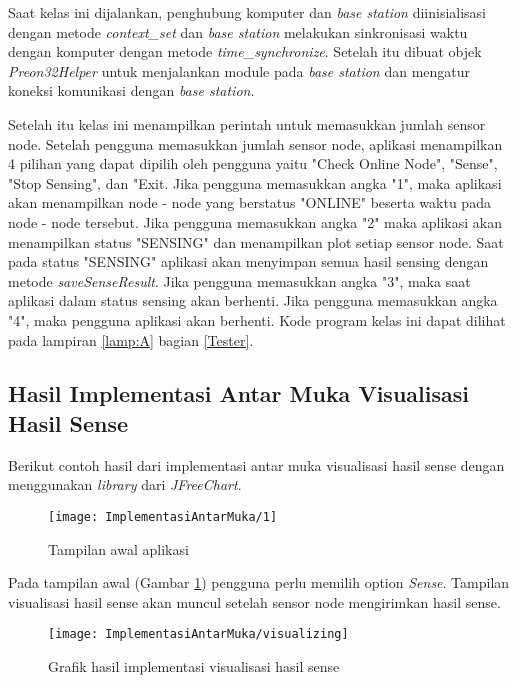 Saat kelas ini dijalankan, penghubung komputer dan {\it base station} diinisialisasi dengan metode {\it context\_set} dan {\it base station} melakukan sinkronisasi waktu dengan komputer dengan metode {\it time\_synchronize}. Setelah itu dibuat objek {\it Preon32Helper} untuk menjalankan module pada {\it base station} dan mengatur koneksi komunikasi dengan {\it base station}. 

Setelah itu kelas ini menampilkan perintah untuk memasukkan jumlah sensor node. Setelah pengguna memasukkan jumlah sensor node, aplikasi menampilkan 4 pilihan yang dapat dipilih oleh pengguna yaitu "Check Online Node", "Sense", "Stop Sensing", dan "Exit. Jika pengguna memasukkan angka "1", maka aplikasi akan menampilkan node - node yang berstatus "ONLINE" beserta waktu pada node - node tersebut. Jika pengguna memasukkan angka "2" maka aplikasi akan menampilkan status "SENSING" dan menampilkan plot setiap sensor node. Saat pada status "SENSING" aplikasi akan menyimpan semua hasil sensing dengan metode {\it saveSenseResult}. Jika pengguna memasukkan angka "3", maka saat aplikasi dalam status sensing akan berhenti. Jika pengguna memasukkan angka "4", maka pengguna aplikasi akan berhenti. Kode program kelas ini dapat dilihat pada lampiran \ref{lamp:A} bagian \ref{Tester}.

\subsection{Hasil Implementasi Antar Muka Visualisasi Hasil Sense}
Berikut contoh hasil dari implementasi antar muka visualisasi hasil sense dengan menggunakan {\it library} dari {\it JFreeChart}.

\begin{figure}[H]
	\centering
	\texttt{[image: ImplementasiAntarMuka/1]}  
	\caption[Tampilan awal aplikasi ]{Tampilan awal aplikasi} 
	\label{fig:implementasi1} 
\end{figure}
Pada tampilan awal (Gambar \ref{fig:implementasi1}) pengguna perlu memilih option {\it Sense}. Tampilan visualisasi hasil sense akan muncul setelah sensor node mengirimkan hasil sense.

\begin{figure}[H]
	\centering
	\texttt{[image: ImplementasiAntarMuka/visualizing]}  
	\caption[Grafik hasil implementasi visualisasi hasil sense ]{Grafik hasil implementasi visualisasi hasil sense} 
	\label{fig:implementasiV} 
\end{figure}


